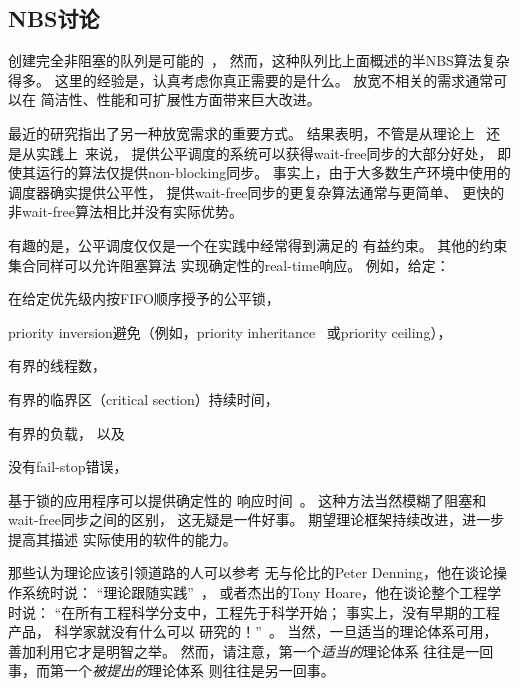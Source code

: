 \subsection{NBS讨论}
\label{sec:advsync:NBS Discussion}

创建完全非阻塞的队列是可能的~\cite{MichaelScott96}，
然而，这种队列比上面概述的半NBS算法复杂得多。
这里的经验是，认真考虑你真正需要的是什么。
放宽不相关的需求通常可以在
简洁性、性能和可扩展性方面带来巨大改进。

最近的研究指出了另一种放宽需求的重要方式。
结果表明，不管是从理论上~\cite{DanAlitarh2013PracticalProgress}
还是从实践上~\cite{SamyAlBahra2013NBS}来说，
提供公平调度的系统可以获得wait-free同步的大部分好处，
即使其运行的算法仅提供non-blocking同步。
事实上，由于大多数生产环境中使用的调度器确实提供公平性，
提供wait-free同步的更复杂算法通常与更简单、
更快的非wait-free算法相比并没有实际优势。

有趣的是，公平调度仅仅是一个在实践中经常得到满足的
有益约束。
其他的约束集合同样可以允许阻塞算法
实现确定性的real-time响应。
例如，给定：
\begin{enumerate*}[(1)]
\item 在给定优先级内按FIFO顺序授予的公平锁，
\item priority inversion避免（例如，priority
inheritance~\cite{Takada:1995:RSN:527074.828566,Cai-DongWang1996PrioInherLock}
或priority ceiling），
\item 有界的线程数，
\item 有界的临界区（critical section）持续时间，
\item 有界的负载，
以及
\item 没有fail-stop错误，
\end{enumerate*}
基于锁的应用程序可以提供确定性的
响应时间~\cite{BjoernBrandenburgPhD,DipankarSarma2004OLSscalability}。
这种方法当然模糊了阻塞和wait-free同步之间的区别，
这无疑是一件好事。
期望理论框架持续改进，进一步提高其描述
实际使用的软件的能力。

那些认为理论应该引领道路的人可以参考
无与伦比的Peter Denning，他在谈论操作系统时说：
``理论跟随实践''~\cite{Denning:2015:POF:2830903.2830904}，
或者杰出的Tony Hoare，他在谈论整个工程学时说：
``在所有工程科学分支中，工程先于科学开始；
事实上，没有早期的工程产品，
科学家就没有什么可以
研究的！''~\cite{RichardMorris2007TonyHoareInterview}。
当然，一旦适当的理论体系可用，
善加利用它才是明智之举。
然而，请注意，第一个\emph{适当的}理论体系
往往是一回事，而第一个\emph{被提出的}理论体系
则往往是另一回事。

